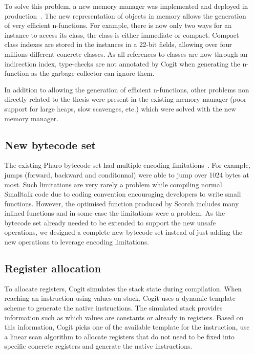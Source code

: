 \documentclass[a4paper,12pt,twoside]{../includes/ThesisStyle}
\begin{document}
To solve this problem, a new memory manager was implemented and deployed in production~\cite{Mir15a}. The new representation of objects in memory allows the generation of very efficient n-functions. For example, there is now only two ways for an instance to access its class, the class is either immediate or compact. Compact class indexes are stored in the instances in a 22-bit fields, allowing over four millions different concrete classes. As all references to classes are now through an indirection index, type-checks are not annotated by Cogit when generating the n-function as the garbage collector can ignore them.

In addition to allowing the generation of efficient n-functions, other problems non directly related to the thesis were present in the existing memory manager (poor support for large heaps, slow scavenges, etc.) which were solved with the new memory manager.


\subsection{New bytecode set}

The existing Pharo bytecode set had multiple encoding limitations~\cite{Bera14a}. For example, jumps (forward, backward and conditonnal) were able to jump over 1024 bytes at most. Such limitations are very rarely a problem while compiling normal Smalltalk code due to coding convention encouraging developers to write small functions. However, the optimised function produced by Scorch includes many inlined functions and in some case the limitations were a problem. As the bytecode set already needed to be extended to support the new unsafe operations, we designed a complete new bytecode set instead of just adding the new operations to leverage encoding limitations.

\subsection{Register allocation}

To allocate registers, Cogit simulates the stack state during compilation. When reaching an instruction using values on stack, Cogit uses a dynamic template scheme to generate the native instructions. The simulated stack provides information such as which values are constants or already in registers. Based on this information, Cogit picks one of the available template for the instruction, use a linear scan algorithm to allocate registers that do not need to be fixed into specific concrete registers and generate the native instructions.
\end{document}
